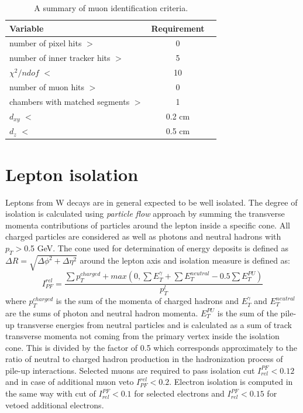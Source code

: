   \begin{table}[h]
\centering
  \caption{A summary of muon identification criteria.}
  \label{tab:muID}
  \begin{tabular}{ l  c c}
      \hline
      \hline
      	Variable & Requirement \\
      	\hline
    		number of pixel hits $>$ &  0 \\
     	number of inner tracker hits $>$ &  5 \\
     	$\chi^2/ndof$ $<$ & 10 \\
		number of muon hits $>$ & 0  \\
		chambers with matched segments $>$ & 1  \\		
		$d_{xy}$ $<$ & 0.2 cm \\
		$d_{z}$ $<$  & 0.5 cm \\
      \hline
      \hline 
  \end{tabular}
\end{table}
 


\section{Lepton isolation}
Leptons from W decays are in general expected to be well isolated. The degree of isolation is calculated using \textit{particle flow} approach by summing the transverse momenta contributions of particles around the lepton inside a specific cone. All charged particles are considered as well as photons and neutral hadrons with $p_T>$0.5 GeV. The cone used for determination of energy deposits is defined as $\Delta R = \sqrt{\Delta \phi^2+ \Delta \eta^2}$ around the lepton axis and isolation measure is defined as:
\begin{equation}
I_{PF}^{rel} = \frac{\sum p_T^{charged} + max(0, \sum E_T^{\gamma}+\sum E_T^{neutral}-0.5\sum E_T^{PU})}{p_T^l}
\end{equation}
where $p_T^{charged}$ is the sum of the momenta of charged hadrons and $E_T^{\gamma} $ and $E_T^{neutral}$ are the sums of photon and neutral hadron momenta. $E_T^{PU}$ is the sum of the pile-up transverse energies from neutral particles and is calculated as a sum of track transverse momenta not coming from the primary vertex inside the isolation cone. This is divided by the factor of 0.5 which corresponds approximately to the ratio of neutral to charged hadron production in the hadronization process of pile-up interactions. Selected muons are required to pass isolation cut $I_{rel}^{PF}<0.12$ and in case of additional muon veto $I_{PF}^{rel}<0.2$. Electron isolation is computed in the same way with cut of $I_{rel}^{PF}<0.1$ for selected electrons and $I_{rel}^{PF}<0.15$ for vetoed additional electrons.


